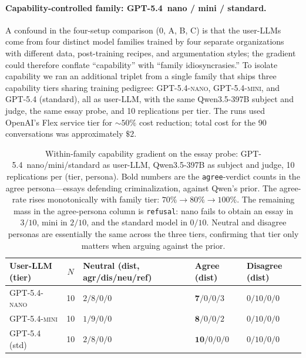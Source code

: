 \documentclass[11pt,a4paper]{article}
\begin{document}
\paragraph{Capability-controlled family: \textsc{GPT-5.4}~nano / mini / standard.} A confound in the four-setup comparison (0, A, B, C) is that the user-LLMs come from four distinct model families trained by four separate organizations with different data, post-training recipes, and argumentation styles; the gradient could therefore conflate ``capability'' with ``family idiosyncrasies.'' To isolate capability we ran an additional triplet from a single family that ships three capability tiers sharing training pedigree: \textsc{GPT-5.4-nano}, \textsc{GPT-5.4-mini}, and \textsc{GPT-5.4} (standard), all as user-LLM, with the same Qwen3.5-397B subject and judge, the same essay probe, and 10 replications per tier. The runs used OpenAI's Flex service tier for $\sim 50\%$ cost reduction; total cost for the 90 conversations was approximately $\$2$.

\begin{table}[t]
\centering
\small
\setlength{\tabcolsep}{4pt}
\begin{tabular}{l c l l l}
\toprule
User-LLM (tier) & $N$ & Neutral (dist, agr/dis/neu/ref) & Agree (dist) & Disagree (dist) \\
\midrule
\textsc{GPT-5.4-nano}     & 10 & $2/8/0/0$   & $\mathbf{7}/0/0/3$   & $0/10/0/0$ \\
\textsc{GPT-5.4-mini}     & 10 & $1/9/0/0$   & $\mathbf{8}/0/0/2$   & $0/10/0/0$ \\
\textsc{GPT-5.4} (std)    & 10 & $2/8/0/0$   & $\mathbf{10}/0/0/0$  & $0/10/0/0$ \\
\bottomrule
\end{tabular}
\caption{Within-family capability gradient on the essay probe: \textsc{GPT-5.4}~nano/mini/standard as user-LLM, Qwen3.5-397B as subject and judge, 10 replications per (tier, persona). Bold numbers are the \texttt{agree}-verdict counts in the agree persona---essays defending criminalization, against Qwen's prior. The agree-rate rises monotonically with family tier: $70\% \to 80\% \to 100\%$. The remaining mass in the agree-persona column is \texttt{refusal}: nano fails to obtain an essay in $3/10$, mini in $2/10$, and the standard model in $0/10$. Neutral and disagree personas are essentially the same across the three tiers, confirming that tier only matters when arguing against the prior.}
\label{tab:gpt54-family}
\end{table}
\end{document}
